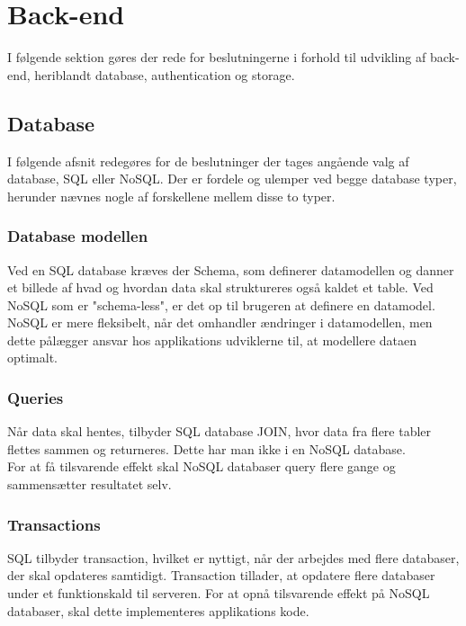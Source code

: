 \section{Back-end}
I følgende sektion gøres der rede for beslutningerne i forhold til udvikling af back-end, heriblandt database, authentication og storage.

\subsection{Database}
I følgende afsnit redegøres for de beslutninger der tages angående valg af database, SQL\cite{SQL} eller NoSQL\cite{NoSQL}.
Der er fordele og ulemper ved begge database typer, herunder nævnes nogle af forskellene mellem disse to typer.

\subsubsection{Database modellen}

Ved en SQL database kræves der Schema\cite{Schema}, som definerer datamodellen og danner et billede af hvad og hvordan data skal struktureres også kaldet et table. Ved NoSQL som er "schema-less", er det op til brugeren at definere en datamodel. NoSQL er mere fleksibelt, når det omhandler ændringer i datamodellen, men dette pålægger ansvar hos applikations udviklerne til, at modellere dataen optimalt.

\subsubsection{Queries\cite{Query}}
Når data skal hentes, tilbyder SQL database JOIN\cite{JOIN}, hvor data fra flere tabler flettes sammen og returneres. Dette har man ikke i en NoSQL database. \\
For at få tilsvarende effekt skal NoSQL databaser query flere gange og sammensætter resultatet selv.

\subsubsection{Transactions\cite{Transactions}}
 SQL tilbyder transaction, hvilket er nyttigt, når der arbejdes med flere databaser, der skal opdateres samtidigt. Transaction tillader, at opdatere flere databaser under et funktionskald til serveren. For at opnå tilsvarende effekt på NoSQL databaser, skal dette implementeres applikations kode. 

